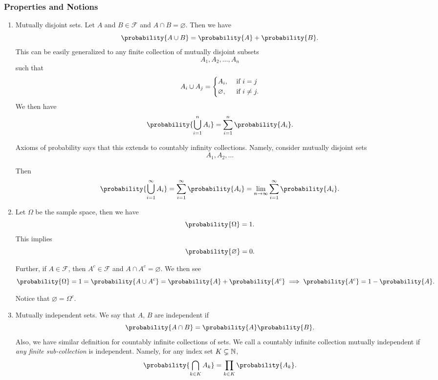\subsubsection{Properties and Notions}
\begin{enumerate}
	\item Mutually disjoint sets. Let \(A\) and \(B\in\mathcal{F}\) and \(A\cap B = \varnothing\). Then we have
	      \[
		      \probability{A\cup B} = \probability{A} +\probability{B}.
	      \]
	      This can be easily generalized to any finite collection of mutually disjoint subsets
	      \[
		      A_1, A_2, \ldots , A_n
	      \]
	      such that
	      \[
		      A_i \cup A_j = \begin{dcases}
			      A_i,         & \text{ if }i = j    \\
			      \varnothing, & \text{ if }i\neq j.
		      \end{dcases}
	      \]
	      We then have \[
		      \probability{\bigcup\limits_{i = 1}^n A_{i}} = \sum\limits_{i=1}^{n} \probability{A_{i}}.
	      \]
	      \begin{remark}
		      Axioms of probability says that this extends to countably infinity collections. Namely, consider mutually disjoint sets
		      \[
			      A_1, A_2, \ldots
		      \]

		      Then
		      \[
			      \probability{\bigcup\limits_{i=1}^{\infty} A_{i}} = \sum\limits_{i=1}^{\infty} \probability{A_{i}} = \lim_{n \to \infty} \sum\limits_{i=1}^{\infty} \probability{A_{i}}.
		      \]
	      \end{remark}
	\item Let \(\Omega\) be the sample space, then we have
	      \[
		      \probability{\Omega} = 1.
	      \]
	      This implies
	      \[
		      \probability{\varnothing } = 0.
	      \]

	      Further, if \(A\in\mathcal{F}\), then \(A^{c}\in\mathcal{F}\) and \(A\cap A^{c}= \varnothing \). We then see
	      \[
		      \probability{\Omega} = 1 = \probability{A\cup A^{c}} = \probability{A} + \probability{A^{c}} \implies \probability{A^{c}} = 1 - \probability{A}.
	      \]

	      Notice that \(\varnothing  = \Omega^{c}\).
	\item Mutually independent sets. We say that \(A\), \(B\) are independent if
	      \[
		      \probability{A\cap B} = \probability{A}\probability{B}.
	      \]
	      Also, we have similar definition for countably infinite collections of sets. We call a countably infinite collection mutually independent if \emph{any finite sub-collection}
	      is independent. Namely, for any index set \(K\subsetneq \mathbb{\MakeUppercase{N}}\),
	      \[
		      \probability{\bigcap\limits_{k\in K} A_k } = \prod_{k\in K} \probability{A_k}.
	      \]
\end{enumerate}

